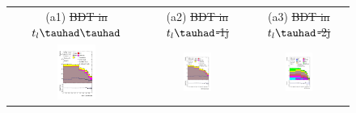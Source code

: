 \documentclass[PAPER, coverpage, atlasdraft=true, texlive=2016, UKenglish]{\ATLASLATEXPATH atlasdoc}
\providecommand{\DIFdel}[1]{{\protect\color{red}\sout{#1}}}                      %
\providecommand{\DIFdelFL}[1]{\DIFdel{#1}} %
\providecommand{\DIFaddbeginFL}{} %
\providecommand{\DIFaddendFL}{} %
\providecommand{\DIFdelbeginFL}{} %
\providecommand{\DIFdelendFL}{} %
\begin{document}
\begin{figure}[H]
\begin{tabular}{@{}ccc@{}}
(a1)  \DIFdelbeginFL \DIFdelFL{BDT in $t_l\thadhad$ }\DIFdelendFL & (a2) \DIFdelbeginFL \DIFdelFL{BDT in  $t_l\tauhad$-1j}\DIFdelendFL & (a3) \DIFdelbeginFL \DIFdelFL{BDT in $t_l\tauhad$-2j}\DIFdelendFL \\
\DIFdelbeginFL %
\DIFdelendFL \DIFaddbeginFL \includegraphics[width=0.3\textwidth]{figures/tcH_reg1l1tau1b2j_os.pdf}\DIFaddendFL &
\DIFdelbeginFL %
\DIFdelendFL \DIFaddbeginFL \includegraphics[width=0.3\textwidth]{figures/tcH_reg1l1tau1b3j_os.pdf}\DIFaddendFL &
\DIFdelbeginFL %
\DIFdelendFL \DIFaddbeginFL \includegraphics[width=0.3\textwidth]{figures/tcH_reg2mtau1b2jos.pdf}\DIFaddendFL \\

\end{tabular}
\end{figure}
\end{document}

